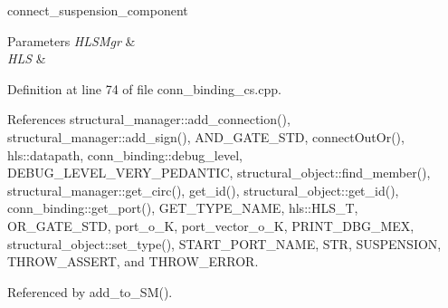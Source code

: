 connect\+\_\+suspension\+\_\+component 


\begin{DoxyParams}{Parameters}
{\em H\+L\+S\+Mgr} & \\
\hline
{\em H\+LS} & \\
\hline
\end{DoxyParams}


Definition at line 74 of file conn\+\_\+binding\+\_\+cs.\+cpp.



References structural\+\_\+manager\+::add\+\_\+connection(), structural\+\_\+manager\+::add\+\_\+sign(), A\+N\+D\+\_\+\+G\+A\+T\+E\+\_\+\+S\+TD, connect\+Out\+Or(), hls\+::datapath, conn\+\_\+binding\+::debug\+\_\+level, D\+E\+B\+U\+G\+\_\+\+L\+E\+V\+E\+L\+\_\+\+V\+E\+R\+Y\+\_\+\+P\+E\+D\+A\+N\+T\+IC, structural\+\_\+object\+::find\+\_\+member(), structural\+\_\+manager\+::get\+\_\+circ(), get\+\_\+id(), structural\+\_\+object\+::get\+\_\+id(), conn\+\_\+binding\+::get\+\_\+port(), G\+E\+T\+\_\+\+T\+Y\+P\+E\+\_\+\+N\+A\+ME, hls\+::\+H\+L\+S\+\_\+T, O\+R\+\_\+\+G\+A\+T\+E\+\_\+\+S\+TD, port\+\_\+o\+\_\+K, port\+\_\+vector\+\_\+o\+\_\+K, P\+R\+I\+N\+T\+\_\+\+D\+B\+G\+\_\+\+M\+EX, structural\+\_\+object\+::set\+\_\+type(), S\+T\+A\+R\+T\+\_\+\+P\+O\+R\+T\+\_\+\+N\+A\+ME, S\+TR, S\+U\+S\+P\+E\+N\+S\+I\+ON, T\+H\+R\+O\+W\+\_\+\+A\+S\+S\+E\+RT, and T\+H\+R\+O\+W\+\_\+\+E\+R\+R\+OR.



Referenced by add\+\_\+to\+\_\+\+S\+M().

